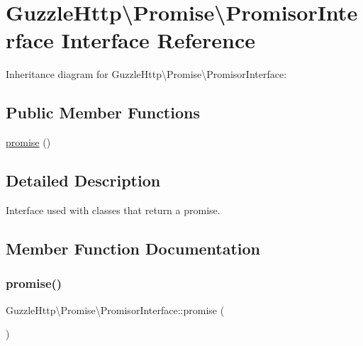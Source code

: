 \hypertarget{interfaceGuzzleHttp_1_1Promise_1_1PromisorInterface}{}\section{Guzzle\+Http\textbackslash{}Promise\textbackslash{}Promisor\+Interface Interface Reference}
\label{interfaceGuzzleHttp_1_1Promise_1_1PromisorInterface}


Inheritance diagram for Guzzle\+Http\textbackslash{}Promise\textbackslash{}Promisor\+Interface\+:
\subsection*{Public Member Functions}
\begin{DoxyCompactItemize}
\item 
\hyperlink{interfaceGuzzleHttp_1_1Promise_1_1PromisorInterface_a228085a17057d886d5486c7c433be879}{promise} ()
\end{DoxyCompactItemize}


\subsection{Detailed Description}
Interface used with classes that return a promise. 

\subsection{Member Function Documentation}
\mbox{\label{interfaceGuzzleHttp_1_1Promise_1_1PromisorInterface_a228085a17057d886d5486c7c433be879}} 
\subsubsection{\texorpdfstring{promise()}{promise()}}
{\footnotesize\ttfamily Guzzle\+Http\textbackslash{}\+Promise\textbackslash{}\+Promisor\+Interface\+::promise (\begin{DoxyParamCaption}{ }\end{DoxyParamCaption})}

